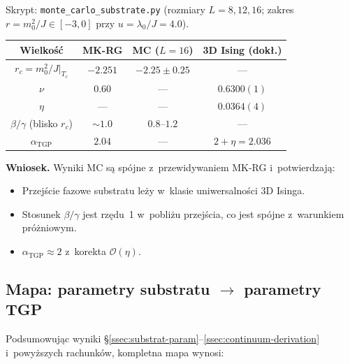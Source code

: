 Skrypt: \texttt{monte\_carlo\_substrate.py} (rozmiary $L = 8, 12, 16$;
zakres $r = m_0^2/J \in [-3, 0]$ przy $u = \lambda_0/J = 4.0$).

\begin{center}
\small
\begin{tabular}{@{}cccc@{}}
\toprule
\textbf{Wielko\'s\'c} & \textbf{MK-RG} & \textbf{MC ($L{=}16$)} & \textbf{3D Ising (dok\l{}.)} \\
\midrule
$r_c = m_0^2/J|_{T_c}$
  & $-2.251$ & $-2.25 \pm 0.25$ & --- \\
$\nu$
  & $0.60$ & --- & $0.6300(1)$ \\
$\eta$
  & --- & --- & $0.0364(4)$ \\
$\beta/\gamma$ (blisko $r_c$)
  & $\sim 1.0$ & $0.8$--$1.2$ & --- \\
$\alpha_{\mathrm{TGP}}$
  & $2.04$ & --- & $2 + \eta = 2.036$ \\
\bottomrule
\end{tabular}
\end{center}

\noindent\textbf{Wniosek.}
Wyniki MC s\k{a} sp\'ojne z~przewidywaniem MK-RG
i~potwierdzaj\k{a}:
\begin{itemize}[nosep]
  \item Przej\'scie fazowe substratu le\.zy w~klasie
    uniwersalno\'sci 3D Isinga.
  \item Stosunek $\beta/\gamma$ jest rz\k{e}du~1 w~pobli\.zu
    przej\'scia, co jest sp\'ojne z~warunkiem pr\'o\.zniowym.
  \item $\alpha_{\mathrm{TGP}} \approx 2$ z~korekta
    $\mathcal{O}(\eta)$.
\end{itemize}

\subsection{Mapa: parametry substratu $\to$ parametry TGP}%
\label{app:B-mapa}

Podsumowuj\k{a}c wyniki
\S\ref{ssec:substrat-param}--\ref{ssec:continuum-derivation}
i~powy\.zszych rachunk\'ow, kompletna mapa wynosi:

